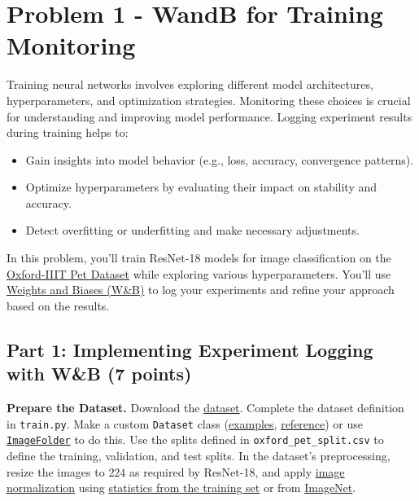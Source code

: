 \documentclass[11pt, oneside]{article}   	%
\begin{document}



\clearpage

\section*{Problem 1 - WandB for Training Monitoring}

Training neural networks involves exploring different model architectures, hyperparameters, and optimization strategies. Monitoring these choices is crucial for understanding and improving model performance. Logging experiment results during training helps to:
\begin{itemize}
    \item Gain insights into model behavior (e.g., loss, accuracy, convergence patterns).
    \item Optimize hyperparameters by evaluating their impact on stability and accuracy.
    \item Detect overfitting or underfitting and make necessary adjustments.
\end{itemize}

In this problem, you'll train ResNet-18 models for image classification on the \href{https://www.kaggle.com/datasets/tanlikesmath/the-oxfordiiit-pet-dataset?select=images}{Oxford-IIIT Pet Dataset} while exploring various hyperparameters. You’ll use \href{https://docs.wandb.ai/tutorials/experiments}{Weights and Biases (W\&B)} to log your experiments and refine your approach based on the results.

\subsection*{Part 1: Implementing Experiment Logging with W\&B (7 points)}

\noindent \textbf{Prepare the Dataset.} Download the \href{https://www.kaggle.com/datasets/tanlikesmath/the-oxfordiiit-pet-dataset?select=images}{dataset}. Complete the dataset definition in \texttt{train.py}. Make a custom \texttt{Dataset} class (\href{https://wandb.ai/sauravmaheshkar/Dataset-DataLoader/reports/An-Introduction-to-Datasets-and-DataLoader-in-PyTorch--VmlldzoxMDI5MTY2}{examples}, \href{https://docs.pytorch.org/vision/main/datasets.html}{reference}) or use \href{https://pytorch.org/vision/stable/generated/torchvision.datasets.ImageFolder.html}{\texttt{ImageFolder}} to do this. Use the splits defined in \texttt{oxford\_pet\_split.csv} to define the training, validation, and test splits. In the dataset's preprocessing, resize the images to $224$ as required by ResNet-18, and apply \href{https://discuss.pytorch.org/t/understanding-transform-normalize/21730}{image normalization} using \href{https://stackoverflow.com/questions/73350133/how-to-calculate-mean-and-standard-deviation-of-a-set-of-images}{statistics from the training set} or from \href{https://stackoverflow.com/questions/58151507/why-pytorch-officially-use-mean-0-485-0-456-0-406-and-std-0-229-0-224-0-2}{ImageNet}.
\end{document}
